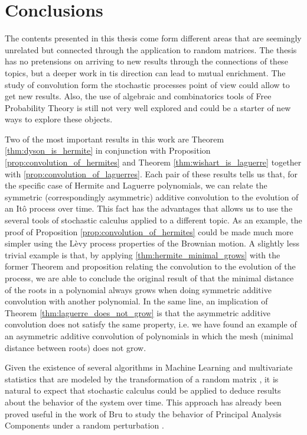 \chapter*{Conclusions}

The contents presented in this thesis come form different areas that are seemingly unrelated but connected through the application to random matrices. The thesis has no pretensions on arriving to new results through the connections of these topics, but a deeper work in tis direction can lead to mutual enrichment. The study of convolution form the stochastic processes point of view could allow to get new results. Also, the use of algebraic and combinatorics tools of Free Probability Theory is still not very well explored and could be a starter of new ways to explore these objects.

Two of the most important results in this work are Theorem \ref{thm:dyson_is_hermite} in conjunction with Proposition \ref{prop:convolution_of_hermites} and Theorem \ref{thm:wishart_is_laguerre} together with \ref{prop:convolution_of_laguerres}. Each pair of these results tells us that, for the specific case of Hermite and Laguerre polynomials, we can relate the symmetric (correspondingly asymmetric) additive convolution to the evolution of an Itô process over time. This fact has the advantages that allows us to use the several tools of stochastic calculus applied to a different topic. As an example, the proof of Proposition \ref{prop:convolution_of_hermites}  could be made much more simpler using the Lèvy process properties of the Brownian motion. A slightly less trivial example is that, by applying \ref{thm:hermite_minimal_grows} with the former Theorem and proposition relating the convolution to the evolution of the process, we are able to conclude the original result of \cite{article:roots_grow_polya} that the minimal distance of the roots in a polynomial always grows when doing symmetric additive convolution with another polynomial. In the same line, an implication of Theorem \ref{thm:laguerre_does_not_grow} is that the asymmetric additive convolution does not satisfy the same property, i.e. we have found an example of an asymmetric additive convolution of polynomials in which the mesh (minimal distance between roots) does not grow.

Given the existence of several algorithms in Machine Learning and multivariate statistics that are modeled by the transformation of a random matrix , it is natural to expect that stochastic calculus could be applied to deduce results about the behavior of the system over time. This approach has already been proved useful in the work of Bru to study the behavior of Principal Analysis Components under a random perturbation \cite{bru1989diffusions}.

